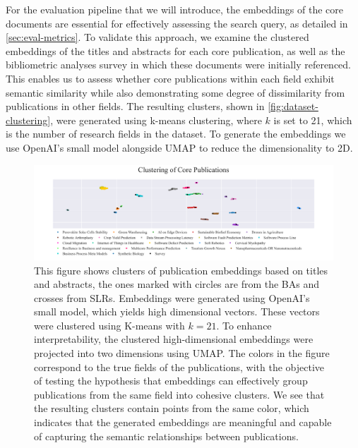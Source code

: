 For the evaluation pipeline that we will introduce, the embeddings of the core documents are essential for effectively assessing the search query, as detailed in \autoref{sec:eval-metrics}. To validate this approach, we examine the clustered embeddings of the titles and abstracts for each core publication, as well as the bibliometric analyses survey in which these documents were initially referenced. This enables us to assess whether core publications within each field exhibit semantic similarity while also demonstrating some degree of dissimilarity from publications in other fields. The resulting clusters, shown in \autoref{fig:dataset-clustering}, were generated using k-means clustering, where $k$ is set to 21, which is the number of research fields in the dataset. To generate the embeddings we use OpenAI's small model alongside UMAP \autocite{mcinnes2020umap} to reduce the dimensionality to 2D.

\begin{figure}
	\hspace*{-1cm}	
	\includegraphics[scale=0.45]{pics/umap_clustering.pdf}
	\caption[Core Publications Clustering]{This figure shows clusters of publication embeddings based on titles and abstracts, the ones marked with circles are from the BAs and crosses from SLRs. Embeddings were generated using OpenAI's small model, which yields high dimensional vectors. These vectors were clustered using K-means with $k=21$. To enhance interpretability, the clustered high-dimensional embeddings were projected into two dimensions using UMAP. The colors in the figure correspond to the true fields of the publications, with the objective of testing the hypothesis that embeddings can effectively group publications from the same field into cohesive clusters. We see that the resulting clusters contain points from the same color, which indicates that the generated embeddings are meaningful and capable of capturing the semantic relationships between publications.}
	\label{fig:dataset-clustering}
\end{figure}


